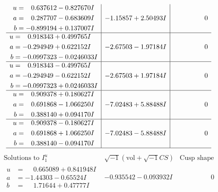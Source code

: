 \documentclass[1p]{elsarticle_modified}
\theoremstyle{definition}
\newcommand{\I}{\sqrt{-1}}
\begin{document}
$$\begin{array}{c|c|c}
\begin{aligned}
u &= \phantom{-}0.637612 - 0.827670 I \\
a &= \phantom{-}0.287707 - 0.683609 I \\
b &= -0.899194 + 0.137007 I\end{aligned}
 & -1.15857 + 2.50493 I & \phantom{-0.000000 } 0 \\ \hline\begin{aligned}
u &= \phantom{-}0.918343 + 0.499765 I \\
a &= -0.294949 + 0.622152 I \\
b &= -0.0997323 - 0.0246033 I\end{aligned}
 & -2.67503 - 1.97184 I & \phantom{-0.000000 } 0 \\ \hline\begin{aligned}
u &= \phantom{-}0.918343 - 0.499765 I \\
a &= -0.294949 - 0.622152 I \\
b &= -0.0997323 + 0.0246033 I\end{aligned}
 & -2.67503 + 1.97184 I & \phantom{-0.000000 } 0 \\ \hline\begin{aligned}
u &= \phantom{-}0.909378 + 0.180627 I \\
a &= \phantom{-}0.691868 - 1.066250 I \\
b &= \phantom{-}0.388140 + 0.094170 I\end{aligned}
 & -7.02483 + 5.88488 I & \phantom{-0.000000 } 0 \\ \hline\begin{aligned}
u &= \phantom{-}0.909378 - 0.180627 I \\
a &= \phantom{-}0.691868 + 1.066250 I \\
b &= \phantom{-}0.388140 - 0.094170 I\end{aligned}
 & -7.02483 - 5.88488 I & \phantom{-0.000000 } 0\\
 \hline 
 \end{array}$$\newpage$$\begin{array}{c|c|c}  
\text{Solutions to }I^u_{1}& \I (\text{vol} + \sqrt{-1}CS) & \text{Cusp shape}\\
 \hline 
\begin{aligned}
u &= \phantom{-}0.665089 + 0.841948 I \\
a &= -1.44303 - 0.65524 I \\
b &= \phantom{-}1.71644 + 0.47777 I\end{aligned}
 & -0.935542 - 0.093932 I & \phantom{-0.000000 } 0 \\ \hline\begin{aligned}

\end{aligned}
\end{array}$$
\end{document}
